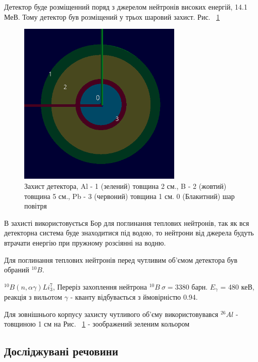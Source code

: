 \documentclass[a4paper, 14pt]{article}
\numberwithin{equation}{section}
\numberwithin{table}{section}
\begin{document}
Детектор буде розміщенний поряд з джерелом нейтронів високих енергій, 14.1 МеВ. Тому детектор був розміщений у трьох шаровий захист. Рис. ~\ref{ris:s_detector_P}	
\begin{figure}[hbt!]
	\centering \includegraphics[width=0.7\textwidth]{images/dectorPrt.png}
	\caption{Захист детектора, Al - 1 (зелений) товщина 2 см., B - 2 (жовтий) товщина 5 см., Pb - 3 (червоний) товщина 1 см. 0 (Блакитний) шар повітря} 
	\label{ris:s_detector_P}	
\end{figure} 
В захисті використовується Бор для поглинання теплових нейтронів, так як вся детекторна система буде знаходитися під водою, то нейтрони від джерела будуть втрачати енергію при пружному розсіянні на водню. 

Для поглинання теплових нейтронів перед чутливим об'ємом детектора був обраний $^{10}B$.  

$^{10}B ( n, \alpha \gamma)Li_3^7$, Переріз захоплення нейтрона $^{10}B \ \sigma = 3380$ барн.
$E_\gamma$ = 480 кеВ, реакція з вильотом $\gamma$ - кванту відбувається з ймовірністю 0.94.

Для зовнішнього корпусу захисту чутливого об'єму використовувався $^{26}Al$ - товщиною 1 см на Рис. ~\ref{ris:s_detector_P} - зоображений зеленим кольором 

\subsection{Досліджувані речовини} 
\end{document}
